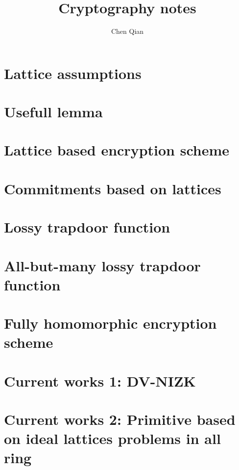 \documentclass[10pt]{book}
\begin{document}
\pagestyle{plain}



\title{Cryptography notes}

\author{Chen Qian}


\maketitle

\tableofcontents



\chapter{Lattice assumptions}


\chapter{Usefull lemma}


\chapter{Lattice based encryption scheme }


\chapter{Commitments based on lattices}


%

\chapter{Lossy trapdoor function}


\chapter{All-but-many lossy trapdoor function}


\chapter{Fully homomorphic encryption scheme}


\chapter{Current works 1: DV-NIZK}


\chapter{Current works 2: Primitive based on ideal lattices problems in all ring~\cite{DBLP:conf/asiacrypt/Lyubashevsky16}}



 
\end{document}
